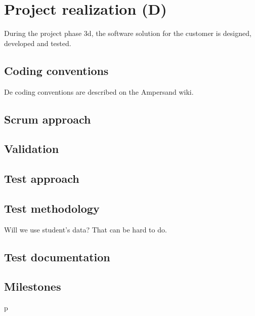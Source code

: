 \section{Project realization (D)}
\label{sec:project-realization}
%
During the project phase 3d, the software solution for the customer is designed, developed and tested.

\subsection{Coding conventions}
\label{subsec:coding-conventions}
%
De coding conventions are described on the Ampersand wiki\cite{ampersand-wiki}.

\subsection{Scrum approach}
\lipsum[1]

\subsection{Validation}
\lipsum[1]

\subsection{Test approach}
\lipsum[1]

\subsection{Test methodology}
Will we use student's data? That can be hard to do.

\subsection{Test documentation}
\lipsum[1]

\subsection{Milestones}
\lipsum[1]p
